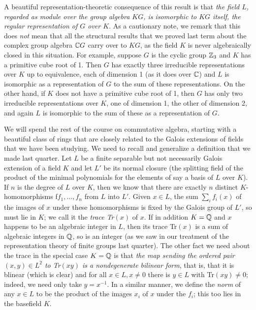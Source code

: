 \documentclass[10pt]{article}
\begin{document}
A beautiful representation-theoretic consequence of this result is that
{\sl the field $L$, regarded as module over the group algebra $KG$, is
  isomorphic to $KG$ itself, the regular representation of $G$ over
  $K$}. As a cautionary note, we remark that this does {\sl not} mean
that all the structural results that we proved last term about the
complex group algebra $\Bbb CG$ carry over to $KG$, as the field $K$ is
never algebraically closed in this situation. For example, suppose $G$
is the cyclic group $\Bbb Z_3$ and $K$ has a primitive cube root of 1.
Then $G$ has exactly three irreducible representations over $K$ up to
equivalence, each of dimension 1 (as it does over $\Bbb C$) and $L$ is
isomorphic as a representation of $G$ to the sum of these
representations. On the other hand, if $K$ does not have a primitive
cube root of 1, then $G$ has only two irreducible representations over
$K$, one of dimension 1, the other of dimension 2, and again $L$ is
isomorphic to the sum of these as a representation of $G$.

We will spend the rest of the course on commutative algebra, starting
with a beautiful class of rings that are closely related to the Galois
extensions of fields that we have been studying. We need to recall and
generalize a definition that we made last quarter. Let $L$ be a finite
separable but not necessarily Galois extension of a field $K$ and let
$L'$ be its normal closure (the splitting field of the product of the
minimal polynomials for the elements of say a basis of $L$ over $K$). If
$n$ is the degree of $L$ over $K$, then we know that there are exactly
$n$ distinct $K$-homomorphisms f$f_1,\ldots,f_n$ from $L$ into $L'$.
Given $x\in L$, the sum $\sum_i f_i(x)$ of the images of $x$ under these
homomorphisms is fixed by the Galois group of $L'$, so must lie in $K$;
we call it the {\sl trace Tr$(x)$} of $x$. If in addition $K=\Bbb Q$ and
$x$ happens to be an algebraic integer in $L$, then its trace Tr$(x)$ is
a sum of algebraic integers in $\Bbb Q$, so is an integer (as we saw in
our treatment of the representation theory of finite groups last
quarter). The other fact we need about the trace in the special case
$K=\Bbb Q$ is that {\sl the map sending the ordered pair $(x,y)\in L^2$
  to Tr$(xy)$ is a nondegenerate bilinear form}, that is, that it is
blinear (which is clear) and for all $x\in L,x\ne0$ there is $y\in L$
with Tr$(xy)\ne0$; indeed, we need only take $y = x^{-1}$. In a similar
manner, we define the {\sl norm} of any $x\in L$ to be the product of
the images $x_i$ of $x$ under the $f_i$; this too lies in the basefield
$K$.
\end{document}
